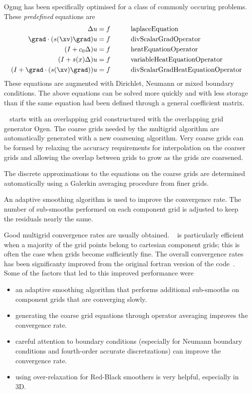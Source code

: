 \documentclass{article}
\begin{document}

Ogmg has been specifically optimised for a class of commonly occuring problems. These
{\sl predefined} equations are 
\begin{alignat*}{3} \label{eq:predefined}
   \Delta u & = f &\qquad&  \mbox{laplaceEquation}  \\
   \grad\cdot( s(\xv) \grad) u & = f &\qquad&  \mbox{divScalarGradOperator} \\
   (I + c_0 \Delta) u & = f &\qquad&  \mbox{heatEquationOperator}  \\
  (I + s(x) \Delta) u & = f &\qquad&  \mbox{variableHeatEquationOperator}  \\
  (I + \grad\cdot( s(\xv) \grad)) u & = f &\qquad&  \mbox{divScalarGradHeatEquationOperator} 
\end{alignat*}
These equations are augmented with Dirichlet, Neumann or mixed boundary conditions.
The above equations can be solved more quickly and with less storage than if the same equation had been
defined through a general coefficient matrix.

\Ogmg~ starts with an overlapping grid constructured with the overlapping grid generator Ogen.
The coarse grids needed by the multigrid algorithm 
are automatically generated with a new coarsening algorithm. Very coarse grids
can be formed by relaxing the accuracy requirements for interpolation on the coarser grids and
allowing the overlap between grids to grow as the grids are coarsened.

The discrete approximations to the equations on the coarse grids are determined automatically
using a Galerkin averaging procedure from finer grids.

An adaptive smoothing algorithm is used to improve the convergence rate. The number of sub-smooths
performed on each component grid is adjusted to keep the residuals nearly the same.

Good multigrid convergence rates are usually obtained. 
\Ogmg~  is particularly efficient when a majority of the grid points belong to cartesian component grids;
this is often the case when grids become sufficiently fine.
The overall convergence rates has been significanty improved from the original fortran version of
the code~\cite{CGMG}. Some of the factors that led to this improved performance were
\begin{itemize}
  \item an adaptive smoothing algorithm that performs additional sub-smooths on component grids that 
        are converging slowly.
  \item generating the coarse grid equations through operator averaging improves the convergence rate.
  \item careful attention to boundary conditions (especially for Neumann boundary conditions and
    fourth-order accurate discretzations) can improve the convergence rate.
  \item using over-relaxation for Red-Black smoothers is very helpful, especially in 3D.
\end{itemize}
\end{document}
